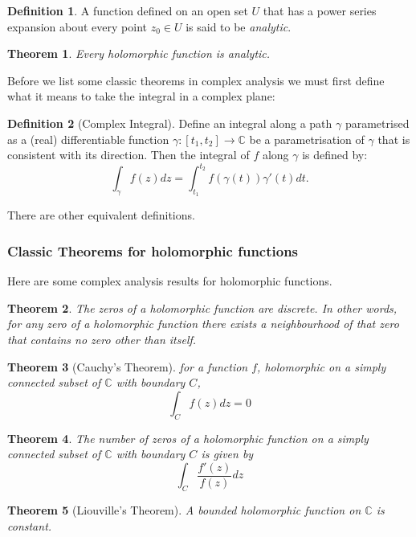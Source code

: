 \documentclass{article}
\newtheorem{thm}{Theorem}[section]
\theoremstyle{definition}
\newtheorem{definition}{Definition}[section]
\theoremstyle{definition}
\theoremstyle{definition}
\newcommand{\C}{\mathbb{C}}
\begin{document}
\begin{definition}
    A function defined on an open set $U$ that has a power series expansion about every point $z_0\in U$ is said to be \emph{analytic}.
\end{definition}
\begin{thm}
    Every holomorphic function is analytic.
\end{thm}
Before we list some classic theorems in complex analysis we must first define what it means to take the integral in a complex plane: 
\begin{definition}[Complex Integral]
   Define an integral along a path $\gamma$ parametrised as a (real) differentiable function $\gamma:[t_1,t_2]\rightarrow \mathbb{C}$ be a parametrisation of $\gamma$ that is consistent with its direction.
\newline\newline
   Then the integral of $f$ along $\gamma$ is defined by: $$\int_{\gamma}f(z)dz=\int_{t_1}^{t_2}f(\gamma(t))\gamma'(t)dt.$$
   
\end{definition}

There are other equivalent definitions.

\subsubsection{Classic Theorems for holomorphic functions}
Here are some complex analysis results for holomorphic functions.

\begin{thm}\label{discretezero}
    The zeros of a holomorphic function are discrete. In other words, for any zero of a holomorphic function there exists a neighbourhood of that zero that contains no zero other than itself.
\end{thm}


\begin{thm}[Cauchy's Theorem]
for a function $f$, holomorphic on a simply connected subset of $\C$ with boundary $C$, 
$$\int_C f(z)dz=0$$
    
\end{thm}


\begin{thm}
    The number of zeros of a holomorphic function on a simply connected subset of $\C$ with boundary $C$ is given by
$$\int_C\frac{f'(z)}{f(z)}dz$$
\end{thm}


\begin{thm}[Liouville's Theorem]

A bounded holomorphic function on $\C$ is constant.
    
\end{thm}
\end{document}
